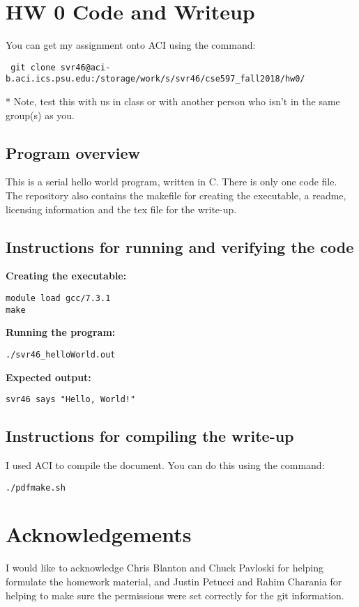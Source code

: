 \documentclass{article}
\begin{document}
\begin{spacing}{1.1}
\section{HW 0 Code and Writeup}

You can get my assignment onto ACI using the command:

\begin{verbatim}
 git clone svr46@aci-b.aci.ics.psu.edu:/storage/work/s/svr46/cse597_fall2018/hw0/
\end{verbatim}

* Note, test this with us in class or with another person who isn't in the same group(s) as you.

\subsection{Program overview}

This is a serial hello world program, written in C. There is only one code file. The repository also contains the makefile for creating the executable, a readme, licensing information and the tex file for the write-up.


\subsection{Instructions for running and verifying the code}

\textbf{Creating the executable:}
\begin{verbatim}
module load gcc/7.3.1
make
\end{verbatim}

\textbf{Running the program:}
\begin{verbatim}
./svr46_helloWorld.out
\end{verbatim}

\textbf{Expected output:}
\begin{verbatim}
svr46 says "Hello, World!"
\end{verbatim}

\subsection{Instructions for compiling the write-up}

I used ACI to compile the document.  You can do this using the command:
\begin{verbatim}
./pdfmake.sh
\end{verbatim}

\section{Acknowledgements}

I would like to acknowledge Chris Blanton and Chuck Pavloski for helping formulate the homework material, and Justin Petucci and Rahim Charania for helping to make sure the permissions were set correctly for the git information.




\end{spacing}
\end{document}
